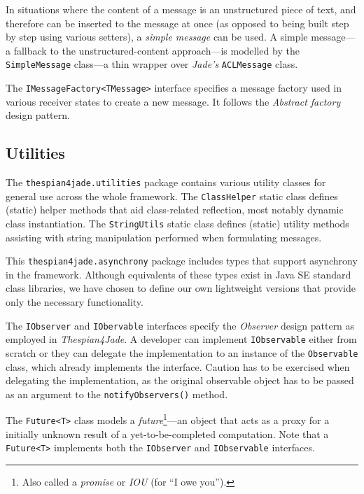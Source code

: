 In situations where the content of a message is an unstructured piece of text, and therefore can be inserted to the message at once (as opposed to being built step by step using various setters), a \textit{simple message} can be used.
A simple message---a fallback to the unstructured-content approach---is modelled by the \texttt{SimpleMessage} class---a thin wrapper over \textit{Jade's} \texttt{ACLMessage} class.

The \texttt{IMessageFactory<TMessage>} interface specifies a message factory used in various receiver states to create a new message.
It follows the \textit{Abstract factory} design pattern.

\subsection{Utilities}

The \texttt{thespian4jade.utilities} package contains various utility classes for general use across the whole framework.
The \texttt{ClassHelper} static class defines (static) helper methods that aid class-related reflection, most notably dynamic class instantiation.
The \texttt{StringUtils} static class defines (static) utility methods assisting with string manipulation performed when formulating messages.

This \texttt{thespian4jade.asynchrony} package includes types that support asynchrony in the framework.
Although equivalents of these types exist in Java SE standard class libraries, we have chosen to define our own lightweight versions that provide only the necessary functionality. 

The \texttt{IObserver} and \texttt{IObervable} interfaces specify the \textit{Observer} design pattern as employed in \textit{Thespian4Jade}.
A developer can implement \texttt{IObservable} either from scratch or they can delegate the implementation to an instance of the \texttt{Observable} class, which already implements the interface.
Caution has to be exercised when delegating the implementation, as the original observable object has to be passed as an argument to the \texttt{notifyObservers()} method.

The \texttt{Future<T>} class models a \textit{future}\footnote{Also called a \textit{promise} or \textit{IOU} (for ``I owe you'').}---an object that acts as a proxy for a initially unknown result of a yet-to-be-completed computation.
Note that a \texttt{Future<T>} implements both the \texttt{IObserver} and \texttt{IObservable} interfaces.

